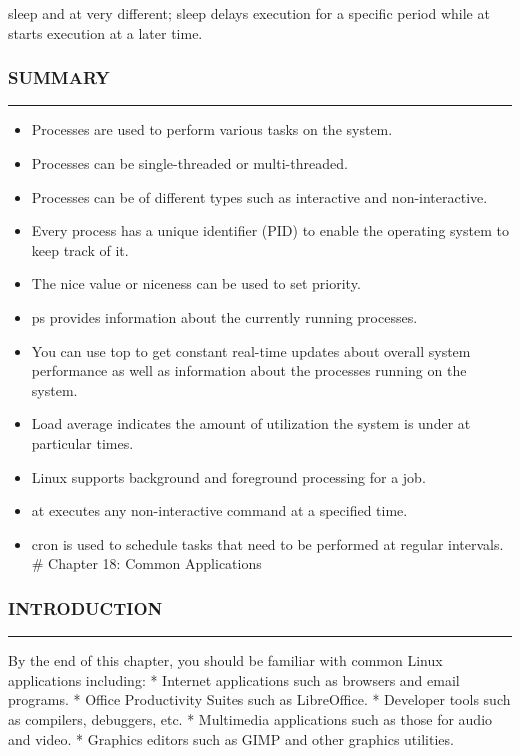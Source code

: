 sleep and at very different; sleep delays execution for a specific
period while at starts execution at a later time.

\subsubsection{SUMMARY}\label{summary-15}

\begin{center}\rule{3in}{0.4pt}\end{center}

\begin{itemize}
\itemsep1pt\parskip0pt
\item
  Processes are used to perform various tasks on the system.
\item
  Processes can be single-threaded or multi-threaded.
\item
  Processes can be of different types such as interactive and
  non-interactive.
\item
  Every process has a unique identifier (PID) to enable the operating
  system to keep track of it.
\item
  The nice value or niceness can be used to set priority.
\item
  ps provides information about the currently running processes.
\item
  You can use top to get constant real-time updates about overall system
  performance as well as information about the processes running on the
  system.
\item
  Load average indicates the amount of utilization the system is under
  at particular times.
\item
  Linux supports background and foreground processing for a job.
\item
  at executes any non-interactive command at a specified time.
\item
  cron is used to schedule tasks that need to be performed at regular
  intervals. \# Chapter 18: Common Applications
\end{itemize}

\subsubsection{INTRODUCTION}\label{introduction-17}

\begin{center}\rule{3in}{0.4pt}\end{center}

By the end of this chapter, you should be familiar with common Linux
applications including: * Internet applications such as browsers and
email programs. * Office Productivity Suites such as LibreOffice. *
Developer tools such as compilers, debuggers, etc. * Multimedia
applications such as those for audio and video. * Graphics editors such
as GIMP and other graphics utilities.

